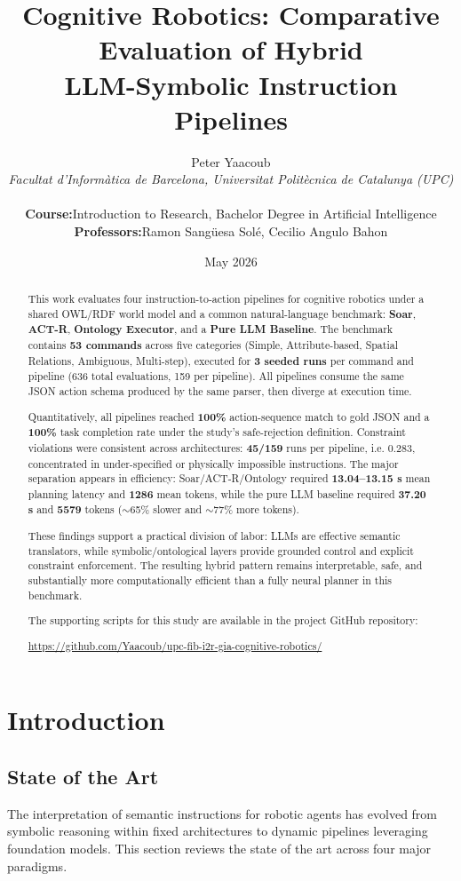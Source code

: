 \documentclass[a4paper]{article}
\title{Cognitive Robotics: Comparative Evaluation of Hybrid\\ LLM-Symbolic Instruction Pipelines}
\author{
    \Large Peter Yaacoub \\[1ex]
    \normalsize\textit{Facultat d'Informàtica de Barcelona, Universitat Politècnica de Catalunya (UPC)} \\[3ex]
    \normalsize
    \begin{tabular}{r l}
        \textbf{Course:} & Introduction to Research, Bachelor Degree in Artificial Intelligence \\
        \textbf{Professors:} & Ramon Sangüesa Solé, Cecilio Angulo Bahon
    \end{tabular}
}
\date{\vspace{1ex} May 2026}
\begin{document}
\maketitle

\begin{abstract}
This work evaluates four instruction-to-action pipelines for cognitive robotics under a shared OWL/RDF world model and a common natural-language benchmark: \textbf{Soar}, \textbf{ACT-R}, \textbf{Ontology Executor}, and a \textbf{Pure LLM Baseline}. The benchmark contains \textbf{53 commands} across five categories (Simple, Attribute-based, Spatial Relations, Ambiguous, Multi-step), executed for \textbf{3 seeded runs} per command and pipeline (636 total evaluations, 159 per pipeline). All pipelines consume the same JSON action schema produced by the same parser, then diverge at execution time.

Quantitatively, all pipelines reached \textbf{100\%} action-sequence match to gold JSON and a \textbf{100\%} task completion rate under the study's safe-rejection definition. Constraint violations were consistent across architectures: \textbf{45/159} runs per pipeline, i.e. 0.283, concentrated in under-specified or physically impossible instructions. The major separation appears in efficiency: Soar/ACT-R/Ontology required \textbf{13.04--13.15 s} mean planning latency and \textbf{1286} mean tokens, while the pure LLM baseline required \textbf{37.20 s} and \textbf{5579} tokens ($\sim$65\% slower and $\sim$77\% more tokens).

These findings support a practical division of labor: LLMs are effective semantic translators, while symbolic/ontological layers provide grounded control and explicit constraint enforcement. The resulting hybrid pattern remains interpretable, safe, and substantially more computationally efficient than a fully neural planner in this benchmark.

The supporting scripts for this study are available in the project GitHub repository:

\url{https://github.com/Yaacoub/upc-fib-i2r-gia-cognitive-robotics/}
\end{abstract}

\tableofcontents

\section{Introduction}

\subsection{State of the Art} 
The interpretation of semantic instructions for robotic agents has evolved from symbolic reasoning within fixed architectures to dynamic pipelines leveraging foundation models. This section reviews the state of the art across four major paradigms.
\end{document}
